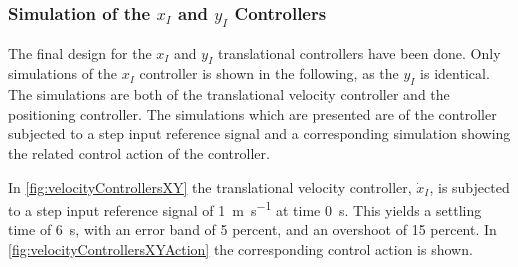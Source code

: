 \subsubsection{Simulation of the $x_I$ and $y_I$ Controllers}
The final design for the $x_I$ and $y_I$ translational controllers have been done. Only simulations of the $x_I$ controller is shown in the following, as the $y_I$ is identical. The simulations are both of the translational velocity controller and the positioning controller. The simulations which are presented are of the controller subjected to a step input reference signal and a corresponding simulation showing the related control action of the controller. 

In \autoref{fig:velocityControllersXY} the translational velocity controller, $\dot{x}_I$, is subjected to a step input reference signal of \SI{1}{m s^{-1}} at time \SI{0}{s}. This yields a settling time of \SI{6}{s}, with an error band of 5 percent, and an overshoot of 15 percent. In \autoref{fig:velocityControllersXYAction} the corresponding control action is shown.

